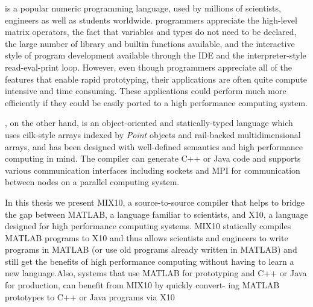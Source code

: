 \matlab is a popular numeric programming language, used by millions of
scientists, engineers as well as students worldwide\cite{MatlabGrowth}.  \matlab
programmers appreciate the high-level matrix operators,  the fact that variables
and types do not need to be declared, the large number of library and builtin
functions available, and the interactive style of program development available
through the IDE and the interpreter-style read-eval-print loop.  However, even
though \matlab programmers appreciate all of the features that enable rapid
prototyping,  their applications are often quite compute intensive and time
consuming. These applications could perform much more efficiently if they could
be easily ported to a high performance computing system.  

\xten\cite{x10}, on the other hand, is an object-oriented and statically-typed
language which uses cilk-style arrays indexed by \emph{Point} objects and
rail-backed multidimensional arrays, and has been designed with well-defined
semantics and high performance computing in mind.  The \xten compiler can
generate C++ or Java code and supports various communication interfaces
including sockets and MPI for communication between nodes on a parallel
computing system.

In this thesis we present MIX10, a source-to-source compiler that helps to
bridge the gap between MATLAB, a language familiar to scientists, and X10, a
language designed for high performance computing systems. MIX10 statically
compiles MATLAB programs to X10 and thus allows scientists and engineers to
write programs in MATLAB (or use old programs already written in MATLAB) and
still get the benefits of high performance computing without having to learn a
new language.Also, systems that use MATLAB for prototyping and C++ or Java for
production, can benefit from MIX10 by quickly convert- ing MATLAB prototypes to
C++ or Java programs via X10

